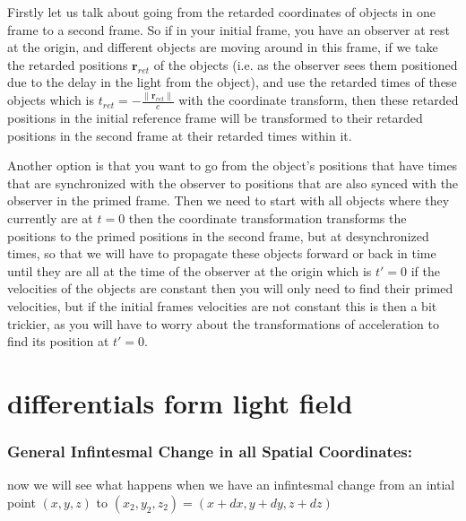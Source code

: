 Firstly let us talk about going from the retarded coordinates of objects in one frame to a second frame.
So if in your initial frame, you have an observer at rest at the origin, and different objects are moving around in this frame, if we take the retarded positions $\mathbf{r}_{ret}$ of the objects (i.e.
as the observer sees them positioned due to the delay in the light from the object), and use the retarded times of these objects which is ${t}_{ret} =-\frac{\|\mathbf{r}_{ret}\|}{c}$ with the coordinate transform, then these retarded positions in the initial reference frame will be transformed to their retarded positions in the second frame at their retarded times within it.
\newline

Another option is that you want to go from the object's positions that have times that are synchronized with the observer to positions that are also synced with the observer in the primed frame.
Then we need to start with all objects where they currently are at ${t} = 0$ then the coordinate transformation transforms the positions to the primed positions in the second frame, but at desynchronized times, so that we will have to propagate these objects forward or back in time until they are all at the time of the observer at the origin which is ${t{'}} = 0$ if the velocities of the objects are constant then you will only need to find their primed velocities, but if the initial frames velocities are not constant this is then a bit trickier, as you will have to worry about the transformations of acceleration to find its position at ${t{'}} = 0$.

\chapter{differentials form light field}\label{ch: differentials form light field}

\subsection{General Infintesmal Change in all Spatial Coordinates:}


now we will see what happens when we have an infintesmal change from an intial point $(x,y,z)$ to $(x_2,y_2,z_2)=(x +dx,y+dy,z+dz)$

